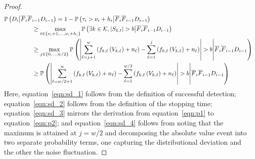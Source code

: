 \documentclass[twoside]{article}
\def\eqref#1{equation~\ref{#1}}
\def\gK{{\mathcal{K}}}
\theoremstyle{plain}
\theoremstyle{definition}
\theoremstyle{remark}
\begin{document}
\begin{proof}
\begin{subequations}
    \begin{align}
        \mathbb{P}\left(D_i \middle| \overline{F}_{i}\overline{F}_{i-1} D_{i-1}\right) &= 1 - \mathbb{P}\left(\tau_i > \nu_i + h_i \middle| \overline{F}_{i}\overline{F}_{i-1} D_{i-1}\right)\label{eqn:sd_1}\\
        &\hspace{-40pt} \geq \max_{t\in\left\{\nu_{i}+1,\ldots,\nu_{i}+h_{i}\right\}} \mathbb{P}\left(\exists k\in\gK, \left|S_{k,t}\right| > b \middle| \overline{F}_{i}\overline{F}_{i-1} D_{i-1}\right)\label{eqn:sd_2}\\
        &\hspace{-40pt} \geq \max_{j\in\left\{0,\ldots,w/2\right\}} \mathbb{P}\left(\left\lvert\sum^{w}_{\ell=j+1}\left(f_{k,\ell}\left(V_{k,\ell}\right)+n_{\ell}\right)-\sum^{j}_{\ell=1}\left(f_{k,\ell}\left(V_{k,\ell}\right)+n_{\ell}\right)\right\rvert > b \middle| \overline{F}_{i}\overline{F}_{i-1} D_{i-1}\right)\label{eqn:sd_3}\\
        &\hspace{-40pt} \geq \mathbb{P}\left(\left\lvert\sum^{w}_{\ell=w/2+1}\left(f_{k,\ell}\left(V_{k,\ell}\right)+n_{\ell}\right)-\sum^{w/2}_{\ell=1}\left(f_{k,\ell}\left(V_{k,\ell}\right)+n_{\ell}\right)\right\rvert > b \middle| \overline{F}_{i}\overline{F}_{i-1} D_{i-1}\right)\label{eqn:sd_4}
    \end{align}
\end{subequations}
Here, \eqref{eqn:sd_1} follows from the definition of successful detection; 
\eqref{eqn:sd_2} follows from the definition of the stopping time; 
\eqref{eqn:sd_3} mirrors the derivation from \eqref{eqn:p1} to \eqref{eqn:p2}; 
and \eqref{eqn:sd_4} follows from noting that the maximum is attained at $j = w/2$ 
and decomposing the absolute value event into two separate probability terms, 
one capturing the distributional deviation and the other the noise fluctuation.


\end{proof}
\end{document}
